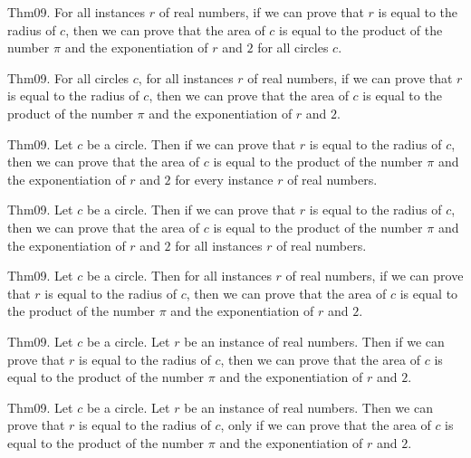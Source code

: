 \documentclass{article}
\begin{document}
Thm09. For all instances $r$ of real numbers, if we can prove that $r$ is equal to the radius of $c$, then we can prove that the area of $c$ is equal to the product of the number \(\pi\) and the exponentiation of $r$ and $2$ for all circles $c$.

Thm09. For all circles $c$, for all instances $r$ of real numbers, if we can prove that $r$ is equal to the radius of $c$, then we can prove that the area of $c$ is equal to the product of the number \(\pi\) and the exponentiation of $r$ and $2$.

Thm09. Let $c$ be a circle. Then if we can prove that $r$ is equal to the radius of $c$, then we can prove that the area of $c$ is equal to the product of the number \(\pi\) and the exponentiation of $r$ and $2$ for every instance $r$ of real numbers.

Thm09. Let $c$ be a circle. Then if we can prove that $r$ is equal to the radius of $c$, then we can prove that the area of $c$ is equal to the product of the number \(\pi\) and the exponentiation of $r$ and $2$ for all instances $r$ of real numbers.

Thm09. Let $c$ be a circle. Then for all instances $r$ of real numbers, if we can prove that $r$ is equal to the radius of $c$, then we can prove that the area of $c$ is equal to the product of the number \(\pi\) and the exponentiation of $r$ and $2$.

Thm09. Let $c$ be a circle. Let $r$ be an instance of real numbers. Then if we can prove that $r$ is equal to the radius of $c$, then we can prove that the area of $c$ is equal to the product of the number \(\pi\) and the exponentiation of $r$ and $2$.

Thm09. Let $c$ be a circle. Let $r$ be an instance of real numbers. Then we can prove that $r$ is equal to the radius of $c$, only if we can prove that the area of $c$ is equal to the product of the number \(\pi\) and the exponentiation of $r$ and $2$.
\end{document}
